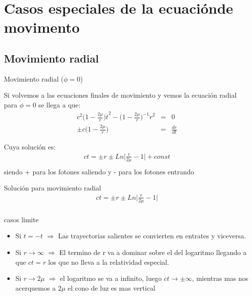 \documentclass[xcolor=dvipsnames]{beamer}
\begin{document}
\section{Casos especiales de la ecuaciónde movimento}
  \subsection{Movimiento radial}
    \begin{frame}{Movimiento radial ($\dot{\phi}=0$)}
    \begin{block}{}
     Si volvemos a las ecuaciones finales de movimiento y vemos la ecuación radial para $\dot{\phi}=0$ se llega a que:
  \begin{eqnarray*}
       c^{2}\Big( 1- \frac{2\mu}{r}\Big) \dot{t}^{2}-\Big( 1- \frac{2\mu}{r}\Big)^{-1} \dot{r}^{2}&=&0\\
       \pm  c\Big( 1- \frac{2\mu}{r}\Big)&=&\frac{dr}{dt}
 \end{eqnarray*}
      \end{block}
      \begin{block}{}
    Cuya solución es:
  \begin{eqnarray*}
       ct=\pm r\pm Ln\Big| \frac{r}{2\mu}-1 \Big|+const\\
 \end{eqnarray*}
 siendo + para los fotones saliendo y - para los fotones entrando
      \end{block}
  \end{frame}


\begin{frame}{}

     
      \begin{block}{Solución para movimiento radial}
  \begin{eqnarray*}
       ct=\pm r\pm Ln\Big| \frac{r}{2\mu}-1 \Big|\\
 \end{eqnarray*}
 
   \end{block}
    \begin{block}{casos limite}
    \begin{itemize}
        \item Si $t=-t$ $\Rightarrow$ Las trayectorias salientes se convierten en entrates y viceversa.
        \item Si $r\rightarrow \infty$ $\Rightarrow$ El termino de r va a dominar sobre el del logaritmo llegando a que $ct=r$ los que no lleva a la relatividad especial.
        \item Si $r\rightarrow 2\mu$ $\Rightarrow$ el logaritmo se va a infinito, luego $ct\rightarrow \pm \infty$, mientras mas nos acerquemos a $2\mu$ el cono de luz es mas vertical 
    \end{itemize}
      \end{block}
  \end{frame}
\end{document}
